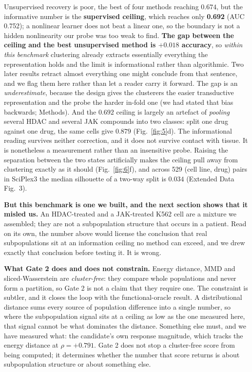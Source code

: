\documentclass[11pt,letterpaper]{article}
\begin{document}
Unsupervised recovery is poor, the best of four methods reaching $0.674$, but the informative number
is the \textbf{supervised ceiling}, which reaches only \textbf{0.692} (AUC 0.752); a nonlinear
learner does not beat a linear one, so the boundary is not a hidden nonlinearity our probe was too
weak to find. \textbf{The gap between the ceiling and the best unsupervised method is
$\mathbf{+0.018}$ accuracy}, so \emph{within this benchmark} clustering already extracts essentially
everything the representation holds and the limit is informational rather than algorithmic. Two
later results retract almost everything one might conclude from that sentence, and we flag them here
rather than let a reader carry it forward. The gap is an \emph{underestimate}, because the design
gives the clusterers the easier transductive representation and the probe the harder in-fold one
(we had stated that bias backwards; Methods). And the $0.692$ ceiling is largely an artefact of
\emph{pooling} several HDAC and several JAK compounds into two classes: split one drug against one
drug, the same cells give $0.879$ (Fig.~\ref{fig:5}d). The informational reading survives neither
correction, and it does not survive contact with tissue. It is nonetheless a measurement rather
than an insensitive probe. Raising the separation between the two states artificially makes the
ceiling pull away from clustering exactly as it should (Fig.~\ref{fig:6}f), and across 529
(cell line, drug) pairs in SciPlex3 the median silhouette of a two-way split is $0.034$ (Extended
Data Fig.~3).

\textbf{But this benchmark is one we built, and the next section shows that it misled us.} An
HDAC-treated and a JAK-treated K562 cell are a mixture we assembled; they are not a subpopulation
structure that occurs in a patient. Read on its own, the number above would license the conclusion
that real subpopulations sit at an information ceiling no method can exceed, and we drew exactly
that conclusion before testing it. It is wrong.

\textbf{What Gate 2 does and does not constrain.} Energy distance, MMD and sliced-Wasserstein are
\emph{cluster-free}: they compare whole populations and never form a partition, so Gate 2 is not a
claim that they require one. The constraint is subtler, and it closes the loop with the
functional-oracle result. A distributional distance sums every source of population difference into
a single number, so where the subpopulation signal sits at a ceiling as low as the one measured
here, that signal cannot be what dominates the distance. Something else must, and we have measured
what: the candidate's own response magnitude, which tracks the energy distance at
$\rho = +0.791$. Gate 2 does not stop a cluster-free score from being computed; it determines
whether the number that score returns is about subpopulation structure or about something else.
\end{document}
